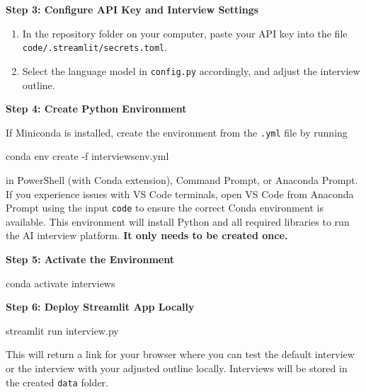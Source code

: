 \documentclass[
  letterpaper,
  DIV=11,
  numbers=noendperiod]{scrartcl}
\newenvironment{Shaded}{\begin{snugshade}}{\end{snugshade}}
\newcommand{\FunctionTok}[1]{\textcolor[rgb]{0.28,0.35,0.67}{#1}}
\newcommand{\NormalTok}[1]{\textcolor[rgb]{0.00,0.23,0.31}{#1}}
\newcommand{\OperatorTok}[1]{\textcolor[rgb]{0.37,0.37,0.37}{#1}}
\begin{document}
\textbf{Step 3: Configure API Key and Interview Settings}

\begin{enumerate}
\def\labelenumi{\arabic{enumi}.}
\item
  In the repository folder on your computer, paste your API key into the
  file \texttt{code/.streamlit/secrets.toml}.
\item
  Select the language model in \texttt{config.py} accordingly, and
  adjust the interview outline.
\end{enumerate}

\textbf{Step 4: Create Python Environment}

If Miniconda is installed, create the environment from the \texttt{.yml}
file by running

\begin{Shaded}
\begin{Highlighting}[]
\NormalTok{conda env create }\OperatorTok{{-}}\NormalTok{f interviewsenv}\OperatorTok{.}\FunctionTok{yml}
\end{Highlighting}
\end{Shaded}

in PowerShell (with Conda extension), Command Prompt, or Anaconda
Prompt. If you experience issues with VS Code terminals, open VS Code
from Anaconda Prompt using the input \texttt{code} to ensure the correct
Conda environment is available. This environment will install Python and
all required libraries to run the AI interview platform. \textbf{It only
needs to be created once.}

\textbf{Step 5: Activate the Environment}

\begin{Shaded}
\begin{Highlighting}[]
\NormalTok{conda activate interviews}
\end{Highlighting}
\end{Shaded}

\textbf{Step 6: Deploy Streamlit App Locally}

\begin{Shaded}
\begin{Highlighting}[]
\NormalTok{streamlit run interview}\OperatorTok{.}\FunctionTok{py}
\end{Highlighting}
\end{Shaded}

This will return a link for your browser where you can test the default
interview or the interview with your adjusted outline locally.
Interviews will be stored in the created \texttt{data} folder.
\end{document}

